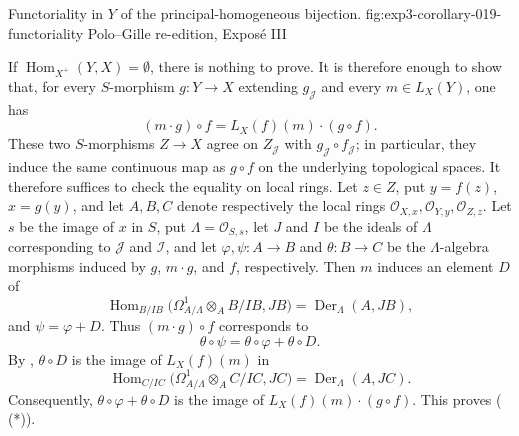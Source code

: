   {Functoriality in \(Y\) of the principal-homogeneous bijection.}
  {fig:exp3-corollary-019-functoriality}
  {Polo--Gille re-edition, Expos\'e III}

If \(\operatorname{Hom}_{X^+}(Y,X)=\emptyset\), there is nothing to
prove. It is therefore enough to show that, for every \(S\)-morphism
\(g:Y\to X\) extending \(g_{\mathscr J}\) and every \(m\in L_X(Y)\),
one has
\begin{equation}
 (m\cdot g)\circ f=L_X(f)(m)\cdot(g\circ f).
 \tag{0.1.9\,(*)}\label{sga3:iii:corollary:0-1-9:equation:0-1-9-star}
\end{equation}
These two \(S\)-morphisms \(Z\to X\) agree on \(Z_{\mathscr J}\) with
\(g_{\mathscr J}\circ f_{\mathscr J}\); in particular, they induce
the same continuous map as \(g\circ f\) on the underlying topological
spaces. It therefore suffices to check the equality on local rings.
Let \(z\in Z\), put \(y=f(z)\), \(x=g(y)\), and let \(A,B,C\) denote
respectively the local rings
\(\mathscr O_{X,x},\mathscr O_{Y,y},\mathscr O_{Z,z}\). Let \(s\) be
the image of \(x\) in \(S\), put \(\Lambda=\mathscr O_{S,s}\), let
\(J\) and \(I\) be the ideals of \(\Lambda\) corresponding to
\(\mathscr J\) and \(\mathscr I\), and let
\(\varphi,\psi:A\to B\) and \(\theta:B\to C\) be the
\(\Lambda\)-algebra morphisms induced by \(g\), \(m\cdot g\), and
\(f\), respectively. Then \(m\) induces an element \(D\) of
\[
 \operatorname{Hom}_{B/IB}
 \bigl(\Omega^1_{A/\Lambda}\otimes_AB/IB,JB\bigr)
 =\operatorname{Der}_{\Lambda}(A,JB),
\]
and \(\psi=\varphi+D\). Thus \((m\cdot g)\circ f\) corresponds to
\[
 \theta\circ\psi=\theta\circ\varphi+\theta\circ D.
\]
By , \(\theta\circ D\) is the image of \(L_X(f)(m)\) in
\[
 \operatorname{Hom}_{C/IC}
 \bigl(\Omega^1_{A/\Lambda}\otimes_AC/IC,JC\bigr)
 =\operatorname{Der}_{\Lambda}(A,JC).
\]
Consequently, \(\theta\circ\varphi+\theta\circ D\) is the image of
\(L_X(f)(m)\cdot(g\circ f)\). This proves (\,(*)).


